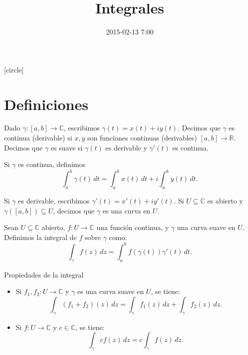 \documentclass[spanish,presentation]{beamer}
\date{2015-02-13 7:00}
\title{Integrales}
\begin{document}
\maketitle
{}
[circle]

\tableofcontents

\section{Definiciones}
\label{sec-1}

\begin{frame}[label=sec-1-1]{}
\begin{definition}
Dado \(\gamma\colon[a,b]\to \mathbb{C}\), escribimos
\(\gamma(t)=x(t)+iy(t)\). Decimos que \(\gamma\) es continua (derivable) si
\(x,y\) son funciones continuas (derivables) \([a,b]\to
    \mathbb{R}\). Decimos que \(\gamma\) es \alert{suave} si \(\gamma(t)\) es
derivable y \(\gamma'(t)\) es continua.

Si \(\gamma\) es continua, definimos
\begin{displaymath}
\int_{a}^{b}\gamma(t)\,dt=\int_{a}^{b}x(t)\,dt+i\int_{a}^{b}y(t)\,dt.
\end{displaymath}

Si \(\gamma\) es derivable, escribimos
\(\gamma'(t)=x'(t)+iy'(t)\). Si \(U\subseteq \mathbb{C}\) es
abierto y \(\gamma([a,b])\subseteq U\), decimos que \(\gamma\) es
una \alert{curva en \(U\)}.
\end{definition}
\end{frame}

\begin{frame}[label=sec-1-2]{}
\begin{definition}
Sean \(U\subseteq \mathbb{C}\) abierto, \(f\colon U\to
    \mathbb{C}\) una función continua, y \(\gamma\) una curva suave en
\(U\). Definimos la \alert{integral de \(f\) sobre \(\gamma\)} como:
\begin{displaymath}
\int_{\gamma}f(z)\,dz=\int_{a}^{b}f(\gamma(t))\gamma'(t)\,dt.
\end{displaymath}
\end{definition}
\end{frame}

\begin{frame}[label=sec-1-3]{Propiedades de la integral}
\begin{itemize}
\item Si \(f_{1}, f_{2}\colon U\to \mathbb{C}\) y \(\gamma\) es una
curva suave en \(U\), se tiene:
\begin{displaymath}
\int_{\gamma}(f_{1}+f_{2})(z)\,dz=\int_{\gamma}f_{1}(z)\,dz+\int_{\gamma}f_{2}(z)\,dz.
\end{displaymath}
\item Si \(f\colon U\to \mathbb{C}\) y \(c\in \mathbb{C}\), se tiene:
\begin{displaymath}
\int_{\gamma}cf(z)\,dz=c\int_{\gamma}f(z)\,dz.
\end{displaymath}
\end{itemize}
\end{frame}
\end{document}
